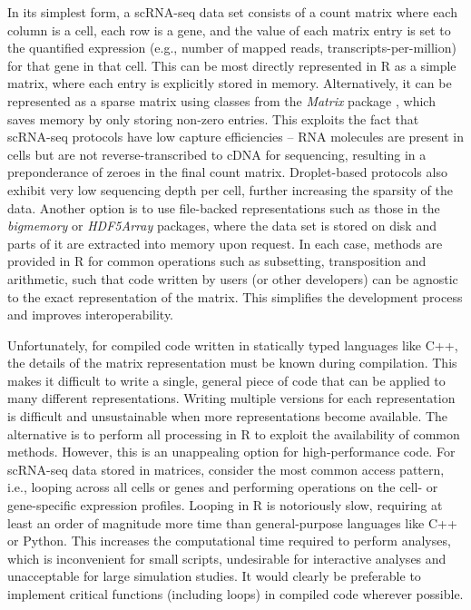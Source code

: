 \documentclass[10pt,letterpaper]{article}
\begin{document}
In its simplest form, a scRNA-seq data set consists of a count matrix where each column is a cell, each row is a gene, and the value of each matrix entry is set to the quantified expression (e.g., number of mapped reads, transcripts-per-million) for that gene in that cell.
This can be most directly represented in R as a simple matrix, where each entry is explicitly stored in memory.
Alternatively, it can be represented as a sparse matrix using classes from the \textit{Matrix} package \cite{bates2017matrix}, which saves memory by only storing non-zero entries.
This exploits the fact that scRNA-seq protocols have low capture efficiencies \cite{grun2015design} -- RNA molecules are present in cells but are not reverse-transcribed to cDNA for sequencing, resulting in a preponderance of zeroes in the final count matrix.
Droplet-based protocols also exhibit very low sequencing depth per cell, further increasing the sparsity of the data.
Another option is to use file-backed representations such as those in the \textit{bigmemory} \cite{kane2013scalable} or \textit{HDF5Array} packages, where the data set is stored on disk and parts of it are extracted into memory upon request.
In each case, methods are provided in R for common operations such as subsetting, transposition and arithmetic, such that code written by users (or other developers) can be agnostic to the exact representation of the matrix.
This simplifies the development process and improves interoperability.

Unfortunately, for compiled code written in statically typed languages like C++, the details of the matrix representation must be known during compilation.
This makes it difficult to write a single, general piece of code that can be applied to many different representations.
Writing multiple versions for each representation is difficult and unsustainable when more representations become available.
The alternative is to perform all processing in R to exploit the availability of common methods.
However, this is an unappealing option for high-performance code.
For scRNA-seq data stored in matrices, consider the most common access pattern, i.e., looping across all cells or genes and performing operations on the cell- or gene-specific expression profiles.
Looping in R is notoriously slow, requiring at least an order of magnitude more time than general-purpose languages like C++ or Python.
This increases the computational time required to perform analyses, which is inconvenient for small scripts, undesirable for interactive analyses and unacceptable for large simulation studies.
It would clearly be preferable to implement critical functions (including loops) in compiled code wherever possible.
\end{document}
